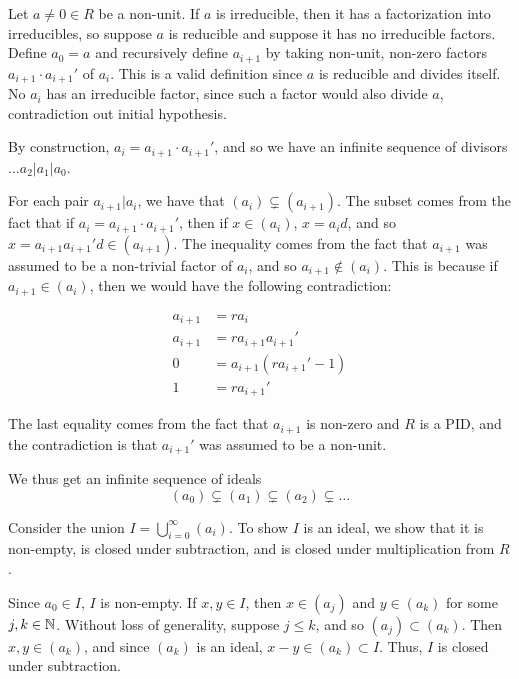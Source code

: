 \documentclass{hmwk}
\begin{document}
\begin{solution}

\pre Let $a \neq 0 \in R$ be a non-unit. If $a$ is irreducible, then it has a factorization into irreducibles, so suppose $a$ is reducible and suppose it has no irreducible factors. Define $a_0 = a$ and recursively define $a_{i+1}$ by taking non-unit, non-zero factors $a_{i+1} \cdot a_{i+1}'$ of $a_i$. This is a valid definition since $a$ is reducible and divides itself. No $a_i$ has an irreducible factor, since such a factor would also divide $a$, contradiction out initial hypothesis. 

\pre By construction, $a_i = a_{i+1}\cdot a_{i+1}'$, and so we have an infinite sequence of divisors $\dots a_2 | a_1 | a_0$. 

\pre For each pair $a_{i + 1} | a_i$, we have that $(a_i) \subsetneq (a_{i+1})$. The subset comes from the fact that if $a_i = a_{i+1} \cdot a_{i + 1}'$, then if $x \in (a_i)$, $x = a_id$, and so $x = a_{i+1}a_{i+1}'d \in (a_{i+1})$. The inequality comes from the fact that $a_{i+1}$ was assumed to be a non-trivial factor of $a_i$, and so $a_{i+1} \notin (a_i)$. This is because if $a_{i+1} \in (a_i)$, then we would have the following contradiction:

\begin{align*}
    a_{i+1} &= ra_i \\
    a_{i+1} &= ra_{i+1}a_{i+1}' \\
    0 &= a_{i+1}(ra_{i+1}' - 1) \\
    1 &= ra_{i+1}'
\end{align*}

\pre The last equality comes from the fact that $a_{i+1}$ is non-zero and $R$ is a PID, and the contradiction is that $a_{i+1}'$ was assumed to be a non-unit. 


\pre We thus get an infinite sequence of ideals $$(a_0) \subsetneq (a_1) \subsetneq (a_2) \subsetneq \dots$$

\pre Consider the union $I = \bigcup_{i=0}^\infty (a_i)$. To show $I$ is an ideal, we show that it is non-empty, is closed under subtraction, and is closed under multiplication from $R$.

\pre Since $a_0 \in I$, $I$ is non-empty. If $x, y \in I$, then $x \in (a_j)$ and $y \in (a_k)$ for some $j, k \in \mathbb{N}$. Without loss of generality, suppose $j \leq k$, and so $(a_j) \subset (a_k)$. Then $x, y \in (a_k)$, and since $(a_k)$ is an ideal, $x - y \in (a_k) \subset I$. Thus, $I$ is closed under subtraction. 


\end{solution}
\end{document}
